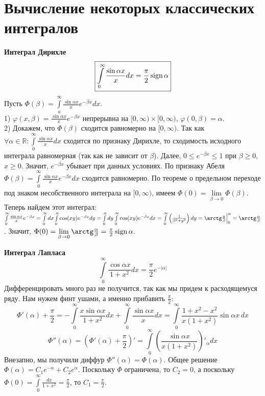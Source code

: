 \section{Вычисление некоторых классических интегралов}

\textbf{Интеграл Дирихле}
$$\boxed{
\int\limits_{0}^{\infty}\frac{\sin\alpha x}{x}dx=\frac{\pi}{2}\operatorname{sign}\alpha}$$
Пусть $\Phi(\beta)=\int\limits_{a}^{\infty}\frac{\sin\alpha x}{x}e^{
-\beta x}dx$.\\
1) $\varphi(x,\beta)=\frac{\sin\alpha x}{x}e^{-\beta x}$ непрерывна на 
$[0,\infty)\times [0,\infty)$, $\varphi(0,\beta)=\alpha$. \\
2) Докажем, что $\Phi(\beta)$ сходится равномерно на $[0,\infty)$.
Так как $\forall \alpha\in \mathbb{R}: \int\limits_{0}^{\infty}
\frac{\sin\alpha x}{x}dx$ сходится по признаку Дирихле, то сходимость
исходного интеграла равномерная (так как не зависит от $\beta$). 
Далее, $0\leqslant e^{-\beta x}\leqslant 1$ при $\beta\geqslant 0$,
$x\geqslant 0$. Значит, $e^{-\beta x}$ убывает при данных условиях.
По признаку Абеля $\Phi(\beta)=\int\limits_{0}^{\infty}\frac{\sin\alpha x}{
x}e^{-\beta x}dx$ сходится равномерно. По теореме о предельном переходе под
знаком несобственного интеграла на $[0,\infty)$, имеем
$\Phi(0)=\lim\limits_{\beta \to 0}\Phi(\beta)$. Теперь найдем этот интеграл:
$\int\limits_{0}^{\infty}\frac{\sin\alpha x}{x}e^{-\beta x}=
\int\limits_{0}^{\infty}dx \int\limits_{0}^{\alpha} \cos(xy)e^{-\beta x}dy=
\int\limits_{0}^{\alpha}dy \int\limits_{0}^{\infty}\cos(xy)e^{-\beta x}dx=
\int\limits_{0}^{\infty}\left(\frac{1}{\beta^2+y^2}\right)dy=
\arctg \frac{y}{\beta}\Big|^\alpha_0=\arctg \frac{\alpha}{\beta}$.
Значит, $\Phi(0)=\lim\limits_{\beta \to 0}\arctg\frac{\alpha}{\beta}=
\frac{\pi}{2}\sign\alpha$. 

\textbf{Интеграл Лапласа}
$$\boxed{
    \int\limits_{0}^{\infty} \frac{\cos\alpha x}{1+x^2}dx=\frac{\pi}{2}
    e^{-|\alpha|}
}$$
Дифференцировать много раз не получится, так как мы придем к расходящемуся 
ряду. Нам нужем финт ушами, а именно прибавить $\frac{\pi}{2}$:
$$\Phi'(\alpha)+\frac{\pi}{2}=-\int\limits_{0}^{\infty} \frac{x\sin\alpha x}{
1+x^2}dx+\int\limits_{0}^{\infty} \frac{\sin\alpha x}{x}dx=
\int\limits_{0}^{\infty}\frac{1+x^2-x^2}{x(1+x^2)}\sin\alpha x\,dx$$
$$\Phi''(\alpha)=\left(\Phi'(\alpha)+\frac{\pi}{2}\right)'
=\int\limits_{0}^{\infty}
\left( \frac{\sin\alpha x}{x(1+x^2)}\right)'_\alpha dx$$
Внезапно, мы получили диффур $\Phi''(\alpha)=\Phi(\alpha)$. Общее решение
$\Phi(\alpha)=C_1e^{-\alpha}+C_2e^{\alpha}$. Поскольку $\Phi$ ограничена,
то  $C_2=0$, а поскольку $\Phi(0)=\int\limits_{0}^{\infty}\frac{dx}{1+x^2}=
\frac{\pi}{2}$, то $C_1=\frac{\pi}{2}$. 





